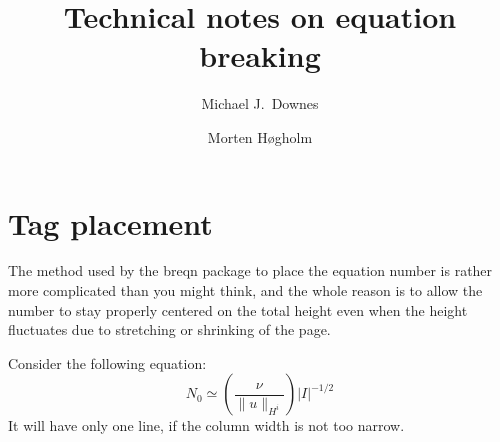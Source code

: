 \documentclass{article}
\title{Technical notes on equation breaking}
\author{Michael J.\ Downes \and Morten H\o gholm}
\begin{document}
\maketitle


\section{Tag placement}

The method used by the breqn package to place the equation number is
rather more complicated than you might think, and the whole reason is
to allow the number to stay properly centered on the total height even
when the height fluctuates due to stretching or shrinking of the page.


Consider the following equation: 
\begin{dmath}[number={3.15}]
  N_{0} \simeq \left( \frac{\nu}{\lVert u\rVert_{H^{i}}} \right) 
  \lvert I\rvert^{-1/2}
\end{dmath}
It will have only one line, if the column width is not too narrow. 
\end{document}
